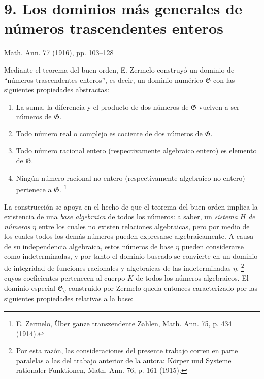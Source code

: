\documentclass[11pt]{article}
\begin{document}
\clearpage
\section*{9. Los dominios más generales de números trascendentes enteros}
\begin{center}
Math. Ann. 77 (1916), pp. 103--128
\end{center}

Mediante el teorema del buen orden, E. Zermelo construyó un dominio de ``números trascendentes enteros'', es decir, un dominio numérico $\mathfrak G$ con las siguientes propiedades abstractas:
\begin{enumerate}
\item[I.] La suma, la diferencia y el producto de dos números de $\mathfrak G$ vuelven a ser números de $\mathfrak G$.
\item[II.] Todo número real o complejo es cociente de dos números de $\mathfrak G$.
\item[III.] Todo número racional entero (respectivamente algebraico entero) es elemento de $\mathfrak G$.
\item[IV.] Ningún número racional no entero (respectivamente algebraico no entero) pertenece a $\mathfrak G$.
\footnote{E. Zermelo, Über ganze transzendente Zahlen, Math. Ann. 75, p. 434 (1914).}
\end{enumerate}

La construcción se apoya en el hecho de que el teorema del buen orden implica la existencia de una \emph{base algebraica} de todos los números: a saber, un \emph{sistema} $H$ \emph{de números} $\eta$ entre los cuales no existen relaciones algebraicas, pero por medio de los cuales todos los demás números pueden expresarse algebraicamente. A causa de su independencia algebraica, estos números de base $\eta$ pueden considerarse como indeterminadas, y por tanto el dominio buscado se convierte en un dominio de integridad de funciones racionales y algebraicas de las indeterminadas $\eta$,
\footnote{Por esta razón, las consideraciones del presente trabajo corren en parte paralelas a las del trabajo anterior de la autora: Körper und Systeme rationaler Funktionen, Math. Ann. 76, p. 161 (1915).}
cuyos coeficientes pertenecen al cuerpo $K$ de todos los números algebraicos. El dominio especial $\mathfrak G_\eta$ construido por Zermelo queda entonces caracterizado por las siguientes propiedades relativas a la base:
\end{document}
